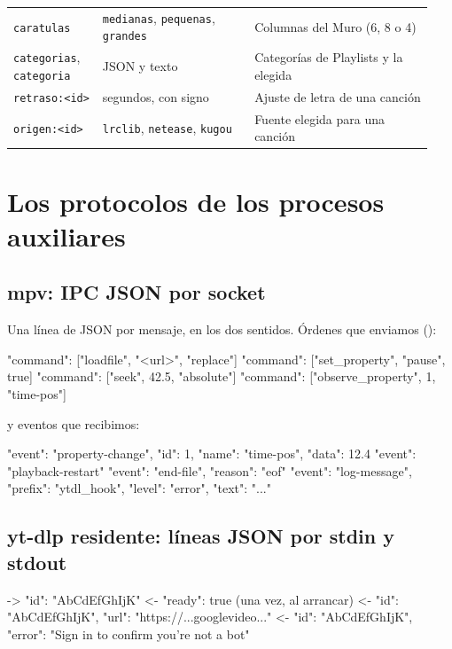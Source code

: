 \begin{center}
\begin{longtable}{@{}p{0.2\linewidth}p{0.34\linewidth}p{0.4\linewidth}@{}}
\texttt{caratulas} & \texttt{medianas}, \texttt{pequenas}, \texttt{grandes} & Columnas del Muro (6, 8 o 4) \\
\texttt{categorias}, \texttt{categoria} & JSON y texto & Categorías de Playlists y la elegida \\
\texttt{retraso:<id>} & segundos, con signo & Ajuste de letra de una canción \\
\texttt{origen:<id>} & \texttt{lrclib}, \texttt{netease}, \texttt{kugou} & Fuente elegida para una canción \\
\bottomrule
\end{longtable}
\end{center}

\section{Los protocolos de los procesos auxiliares}

\subsection{mpv: IPC JSON por socket}

Una línea de JSON por mensaje, en los dos sentidos. Órdenes que enviamos
():

\begin{codigo}
{"command": ["loadfile", "<url>", "replace"]}
{"command": ["set_property", "pause", true]}
{"command": ["seek", 42.5, "absolute"]}
{"command": ["observe_property", 1, "time-pos"]}
\end{codigo}

y eventos que recibimos:

\begin{codigo}
{"event": "property-change", "id": 1, "name": "time-pos", "data": 12.4}
{"event": "playback-restart"}
{"event": "end-file", "reason": "eof"}
{"event": "log-message", "prefix": "ytdl_hook", "level": "error", "text": "..."}
\end{codigo}

\subsection{yt-dlp residente: líneas JSON por stdin y stdout}

\begin{codigo}
-> {"id": "AbCdEfGhIjK"}
<- {"ready": true}                                        (una vez, al arrancar)
<- {"id": "AbCdEfGhIjK", "url": "https://...googlevideo..."}
<- {"id": "AbCdEfGhIjK", "error": "Sign in to confirm you're not a bot"}
\end{codigo}

